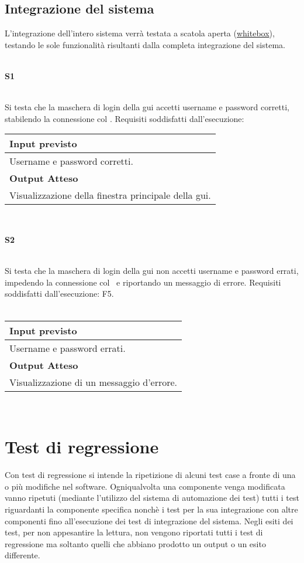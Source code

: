 \subsection{Integrazione del sistema}
L'integrazione dell'intero sistema verr\`a testata a scatola aperta (\underline{whitebox}), testando le sole funzionalit\`a risultanti dalla completa integrazione del sistema.\\
 \\
\begin{Large}\textbf{S1}\end{Large} \\
Si testa che la maschera di login della gui accetti username e password corretti, stabilendo la connessione col \rp.
Requisiti soddisfatti dall'esecuzione: \\
\begin{center}
\begin{tabular}{|p{11cm}|} \hline
\textbf{Input previsto}\\ \hline
Username e password corretti.\\ \hline
\textbf{Output Atteso}\\ \hline
Visualizzazione della finestra principale della gui.\\ \hline
\end{tabular} \\
\end{center}

\begin{Large}\textbf{S2}\end{Large} \\
Si testa che la maschera di login della gui  non accetti username e password errati, impedendo la connessione col \rp\ e riportando un messaggio di errore.
Requisiti soddisfatti dall'esecuzione: F5. \\
 \\
\begin{center}
\begin{tabular}{|p{11cm}|} \hline
\textbf{Input previsto}\\ \hline
Username e password errati.\\ \hline
\textbf{Output Atteso}\\ \hline
Visualizzazione di un messaggio d'errore.\\ \hline
\end{tabular} \\
\end{center}

\section{Test di regressione}
Con test di regressione si intende la ripetizione di alcuni test case a fronte di una o pi\`u modifiche nel software. Ogniqualvolta una componente venga modificata vanno ripetuti (mediante l'utilizzo del sistema di automazione dei test) tutti i test riguardanti la componente specifica nonch\`e i test per la sua integrazione con altre componenti fino all'esecuzione dei test di integrazione del sistema.
Negli esiti dei test, per non appesantire la lettura, non vengono riportati tutti i test di regressione ma soltanto quelli che abbiano prodotto un output o un esito differente.

